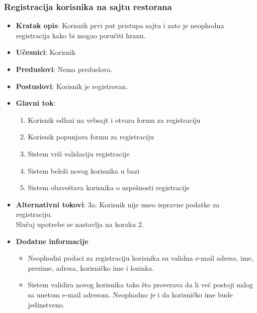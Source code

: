 \subsubsection{Registracija korisnika na sajtu restorana}
\begin{itemize}
    \item \textbf{Kratak opis}:
    Korisnik prvi put pristupa sajtu i zato je neophodna registracija kako bi mogao poručiti hranu.
    \item \textbf{Učesnici}:
    Korisnik
    \item \textbf{Preduslovi}:
    Nema preduslova. 
    \item \textbf{Postuslovi}:
    Korisnik je registrovan. 
    \item \textbf{Glavni tok}:
   \begin{enumerate}
        \item Korisnik odlazi na vebsajt i otvara formu za registraciju
        \item Korisnik popunjava formu za registraciju
        \item Sistem vrši validaciju registracije
        \item Sistem beleži novog korisnika u bazi
        \item Sistem obaveštava korisnika o uspešnosti registracije
\end{enumerate}
\end{itemize}
\begin {itemize}
\item \textbf {Alternativni tokovi}: 
 3a: Korisnik nije uneo ispravne podatke za registraciju.\\
 Slučaj upotrebe se nastavlja na koraku 2.
 \end{itemize}
 \begin{itemize} 
     \item \textbf{Dodatne informacije}
 \begin{itemize}
     \item Neophodni podaci za registraciju korisnika su validna e-mail adresa, ime, prezime, adresa, korisničko ime i lozinka.
    \item Sistem validira novog korisnika tako što proverava da li već postoji nalog sa unetom e-mail adresom. Neophodno je i da korisničko ime bude jedinstveno.
 \end{itemize}
 \end{itemize}
 
 
